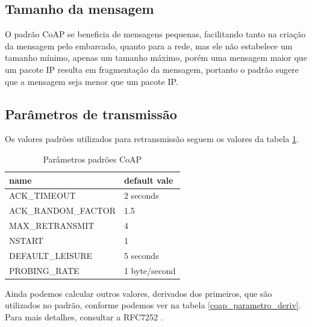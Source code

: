 \subsection{Tamanho da mensagem}

O padrão CoAP se beneficia de mensagens pequenas, facilitando tanto na criação da mensagem pelo embarcado, quanto para a rede, mas ele não estabelece um tamanho mínimo, apenas um tamanho máximo, porém uma mensagem maior que um pacote IP resulta em fragmentação da mensagem, portanto o padrão sugere que a mensagem seja menor que um pacote IP.

\subsection{Parâmetros de transmissão}

Os valores padrões utilizados para retransmissão seguem os valores da tabela \ref{coap_parametro_default}.

\begin{table}[!htb]
	\centering
	\caption{Parâmetros padrões CoAP}
	\label{coap_parametro_default}
	\begin{tabular}{l|l}
		\hline
		name                & default vale  \\ \hline
		ACK\_TIMEOUT        & 2 seconds     \\ \hline
		ACK\_RANDOM\_FACTOR & 1.5           \\ \hline
		MAX\_RETRANSMIT     & 4             \\ \hline
		NSTART              & 1             \\ \hline
		DEFAULT\_LEISURE    & 5 seconds     \\ \hline
		PROBING\_RATE       & 1 byte/second \\ \hline
	\end{tabular}
\end{table}

Ainda podemos calcular outros valores, derivados dos primeiros, que são utilizados no padrão, conforme podemos ver na tabela \ref{coap_parametro_deriv}. Para mais detalhes, consultar a RFC7252 \cite{rfc7252_CoAP}.

